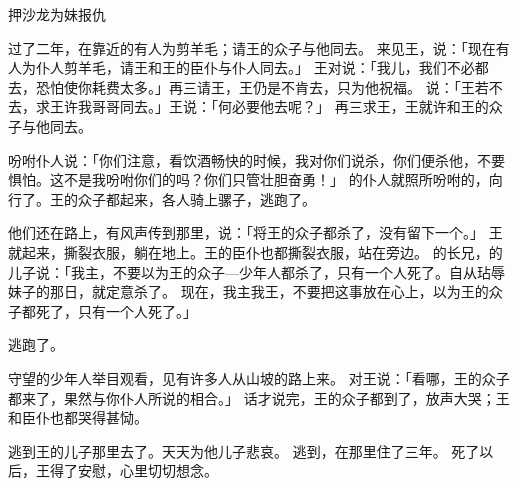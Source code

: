 {\par }{\SH 押沙龙为妹报仇
\par }{\PP {}过了二年，在靠近{}的{}有人为{}剪羊毛；{}请王的众子与他同去。
来见王，说：「现在有人为仆人剪羊毛，请王和王的臣仆与仆人同去。」
王对{}说：「我儿，我们不必都去，恐怕使你耗费太多。」{}再三请王，王仍是不肯去，只为他祝福。
说：「王若不去，求王许我哥哥{}同去。」王说：「何必要他去呢？」
再三求王，王就许{}和王的众子与他同去。
\par }{\PP {}吩咐仆人说：「你们注意，看{}饮酒畅快的时候，我对你们说杀{}，你们便杀他，不要惧怕。这不是我吩咐你们的吗？你们只管壮胆奋勇！」
的仆人就照{}所吩咐的，向{}行了。王的众子都起来，各人骑上骡子，逃跑了。
\par }{\PP {}他们还在路上，有风声传到{}那里，说：「{}将王的众子都杀了，没有留下一个。」
王就起来，撕裂衣服，躺在地上。王的臣仆也都撕裂衣服，站在旁边。
的长兄，{}的儿子{}说：「我主，不要以为王的众子—少年人都杀了，只有{}一个人死了。自从{}玷辱{}妹子{}的那日，{}就定意杀{}了。
现在，我主我王，不要把这事放在心上，以为王的众子都死了，只有{}一个人死了。」
\par }{\PP {}逃跑了。
\par }{\PP 守望的少年人举目观看，见有许多人从山坡的路上来。
对王说：「看哪，王的众子都来了，果然与你仆人所说的相合。」
话才说完，王的众子都到了，放声大哭；王和臣仆也都哭得甚恸。
\par }{\PP {}逃到{}王{}的儿子{}那里去了。{}天天为他儿子悲哀。
逃到{}，在那里住了三年。
死了以后，{}王得了安慰，心里切切想念{}。

}
